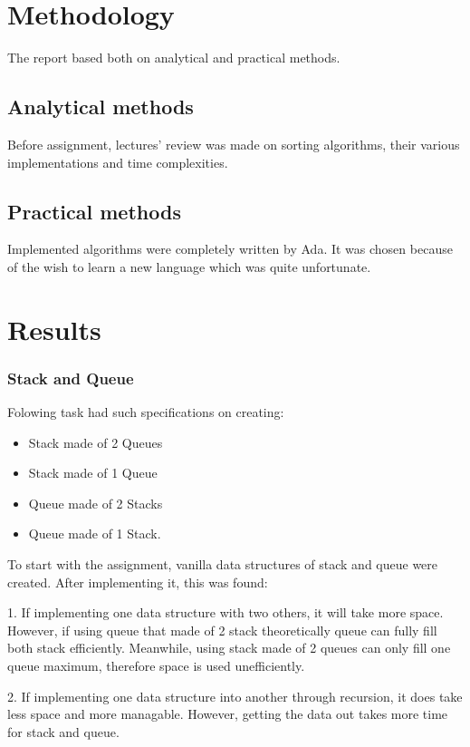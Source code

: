 \documentclass{article}
\begin{document}
\section{Methodology}
The report based both on analytical and practical methods.

\subsection{Analytical methods}
Before assignment, lectures' review was made on sorting algorithms, their various implementations and time complexities. 

\subsection{Practical methods}
Implemented algorithms were completely written by Ada. It was chosen because of the wish to learn a new language which was quite unfortunate.

\section{Results}

\subsubsection{Stack and Queue}
Folowing task had such specifications on creating:
\begin{itemize}
\item Stack made of 2 Queues
\item Stack made of 1 Queue
\item Queue made of 2 Stacks
\item Queue made of 1 Stack.
\end{itemize}

To start with the assignment, vanilla data structures of stack and queue were created. 
After implementing it, this was found:

1. If implementing one data structure with two others, it will take more space. However, if using queue that made of 2 stack theoretically queue can fully fill both stack efficiently. Meanwhile, using stack made of 2 queues can only fill one queue maximum, therefore space is used unefficiently.

2. If implementing one data structure into another through recursion, it does take less space and more managable. However, getting the data out takes more time for stack and queue.
\end{document}
